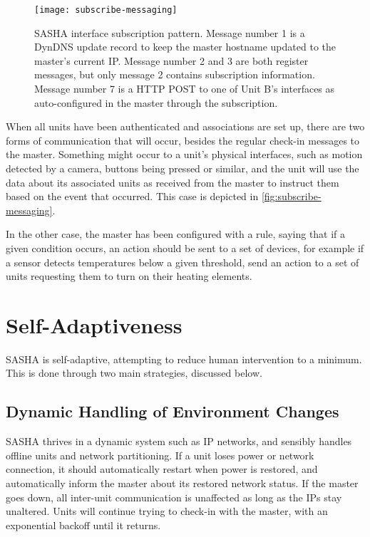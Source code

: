 \begin{figure}[ht!]
    \centering
    \texttt{[image: subscribe-messaging]}
    \caption{SASHA interface subscription pattern. Message number 1 is a DynDNS update record to keep the master hostname updated to the master's current IP. Message number 2 and 3 are both register messages, but only message 2 contains subscription information. Message number 7 is a HTTP POST to one of Unit B's interfaces as auto-configured in the master through the subscription.}
    \label{fig:subscribe-messaging}
\end{figure}

When all units have been authenticated and associations are set up, there are two forms of communication that will occur, besides the regular check-in messages to the master. Something might occur to a unit's physical interfaces, such as motion detected by a camera, buttons being pressed or similar, and the unit will use the data about its associated units as received from the master to instruct them based on the event that occurred. This case is depicted in \autoref{fig:subscribe-messaging}.

In the other case, the master has been configured with a rule, saying that if a given condition occurs, an action should be sent to a set of devices, for example if a sensor detects temperatures below a given threshold, send an action to a set of units requesting them to turn on their heating elements.


\section{Self-Adaptiveness}
SASHA is self-adaptive, attempting to reduce human intervention to a minimum. This is done through two main strategies, discussed below.

\subsection{Dynamic Handling of Environment Changes}
SASHA thrives in a dynamic system such as IP networks, and sensibly handles offline units and network partitioning. If a unit loses power or network connection, it should automatically restart when power is restored, and automatically inform the master about its restored network status. If the master goes down, all inter-unit communication is unaffected as long as the IPs stay unaltered. Units will continue trying to check-in with the master, with an exponential backoff until it returns.


